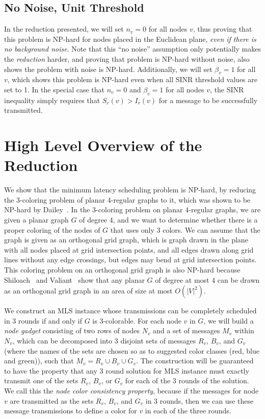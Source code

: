 \documentclass{article}
\begin{document}
\subsection{No Noise, Unit Threshold}
In the reduction presented, we will set $n_v = 0$ for all nodes $v$, thus proving that this problem is NP-hard for nodes placed in the Euclidean plane, {\it even if there is no background noise}. Note that this ``no noise'' assumption only potentially makes the {\it reduction} harder, and proving that problem is NP-hard without noise, also shows the problem with noise is NP-hard.  Additionally, we will set $\beta_v = 1$ for all $v$, which shows this problem is NP-hard even when all SINR threshold values are set to 1.  In the special case that $n_v = 0$ and $\beta_v = 1$ for all nodes $v$, the SINR inequality simply requires that $S_r(v) > I_r(v)$ for a message to be successfully transmitted.



\section{High Level Overview of the Reduction}
\label{sec:highlevel}
We show that the minimum latency scheduling problem is NP-hard, by reducing the 3-coloring problem of planar 4-regular graphs to it, which was shown to be NP-hard by Dailey~\cite{Dailey1980289}.  In the 3-coloring problem on planar 4-regular graphs, we are given a planar graph $G$ of degree 4, and we want to determine whether there is a proper coloring of the nodes of $G$ that uses only 3 colors.  We can assume that the graph is given as an orthogonal grid graph, which is graph drawn in the plane with all nodes placed at grid intersection points, and all edges drawn along grid lines without any edge crossings, but edges may bend at grid intersection points.   This coloring problem on an orthogonal grid graph is also NP-hard because Shiloach~\cite{Shiloach} and Valiant~\cite{Valiant} show that any planar $G$ of degree at most 4 can be drawn as an orthogonal grid graph in an area of size at most $O( |V|^2 )$.


We construct an MLS instance whose transmissions can be completely scheduled in 3 rounds if and only if $G$ is 3-colorable.
For each node $v$ in $G$, we will build a \emph{node gadget} consisting of two rows of nodes $N_v$ and a set of messages $M_v$ within $N_v$, which can be decomposed into 3 disjoint sets of messages $R_v$, $B_v$, and $G_v$ (where the names of the sets are chosen so as to suggested color classes (red, blue and green)), such that $M_v = R_v \cup B_v \cup G_v$.  The construction will be guaranteed to have the property that any 3 round solution for MLS instance must exactly transmit one of the sets $R_v$, $B_v$, or $G_v$ for each of the 3 rounds of the solution.  We call this the \emph{node color consistency property},  because if the messages for node $v$ are transmitted as the sets $R_v$, $B_v$, and $G_v$ in 3 rounds, then we can use these message transmissions to define a color for $v$ in each of the three rounds.
\end{document}
